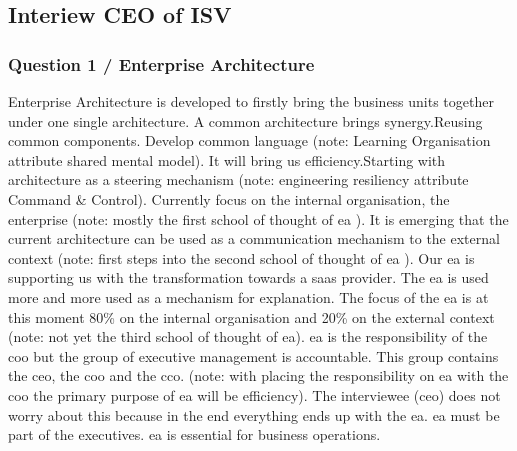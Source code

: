 \subsection{Interiew CEO of ISV}
\label{sub:interviewceoisv}
\subsubsection{Question 1 / Enterprise Architecture}
Enterprise Architecture is developed to firstly bring the business units together under one single architecture. A common architecture brings synergy.Reusing common components. Develop common language (note: Learning Organisation attribute shared mental model). It will bring us efficiency.Starting with architecture as a steering mechanism (note: engineering \gls{resiliency} attribute Command \& Control). Currently focus on the internal organisation, the enterprise (note: mostly the first school of thought of \acrshort{ea} \parencite{Lapalme2012}). It is emerging that the current architecture can be used as a communication mechanism to the external context (note: first steps into the second school of thought of \acrshort{ea} \parencite{Lapalme2012}). Our \acrshort{ea} is supporting us with the transformation towards a \acrfull{saas} provider. The \acrshort{ea} is used more and more used as a mechanism for explanation. The focus of the \acrshort{ea} is at this moment 80\% on the internal organisation and 20\% on the external context (note: not yet the third school of thought of \acrshort{ea}).
\acrshort{ea} is the responsibility of the \acrfull{coo} but the group of executive management is accountable. This group contains the \acrfull{ceo}, the \acrshort{coo} and the \acrfull{cco}. (note: with placing the responsibility on \acrshort{ea} with the \acrshort{coo} the primary purpose of \acrshort{ea} will be efficiency). The interviewee (\acrshort{ceo}) does not worry about this because in the end everything ends up with the \acrshort{ea}. \acrshort{ea} must be part of the executives. \acrshort{ea} is essential for business operations.
